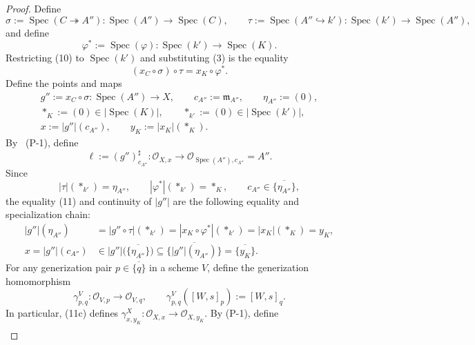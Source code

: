 \begin{proof}
  Define
  \[
    \sigma:=\operatorname{Spec}(C\twoheadrightarrow A'')
      \colon\operatorname{Spec}(A'')\to\operatorname{Spec}(C),
    \qquad
    \tau:=\operatorname{Spec}(A''\hookrightarrow k')
      \colon\operatorname{Spec}(k')\to\operatorname{Spec}(A''),
  \]
  and define
  \[
    \varphi^*:=\operatorname{Spec}(\varphi)
      \colon\operatorname{Spec}(k')\to\operatorname{Spec}(K).
  \]
  Restricting (10) to $\operatorname{Spec}(k')$ and substituting (3) is the
  equality
  \[
    (x_C\circ\sigma)\circ\tau=x_K\circ\varphi^*.                \tag{11}
  \]
  Define the points and maps
  \[
  \begin{gathered}
    g'':=x_C\circ\sigma\colon\operatorname{Spec}(A'')\to X,
    \qquad c_{A''}:=\mathfrak m_{A''},
    \qquad \eta_{A''}:=(0),\\
    \ast_K:=(0)\in|\operatorname{Spec}(K)|,
    \qquad \ast_{k'}:=(0)\in|\operatorname{Spec}(k')|,\\
    x:=|g''|(c_{A''}),
    \qquad y_K:=|x_K|(\ast_K).
  \end{gathered}                                                   \tag{11a}
  \]
  By ~(P-1), define
  \[
    \ell:=(g'')_{c_{A''}}^\sharp
      \colon\mathcal O_{X,x}\longrightarrow
      \mathcal O_{\operatorname{Spec}(A''),c_{A''}}=A''.
                                                                    \tag{11b}
  \]
  Since
  \[
    |\tau|(\ast_{k'})=\eta_{A''},
    \qquad |\varphi^*|(\ast_{k'})=\ast_K,
    \qquad c_{A''}\in\overline{\{\eta_{A''}\}},
  \]
  the equality (11) and continuity of $|g''|$ are the following equality and
  specialization chain:
  \[
  \begin{aligned}
    |g''|(\eta_{A''})
      &=|g''\circ\tau|(\ast_{k'})
       =|x_K\circ\varphi^*|(\ast_{k'})
       =|x_K|(\ast_K)=y_K,\\
    x=|g''|(c_{A''})
      &\in|g''|\bigl(\overline{\{\eta_{A''}\}}\bigr)
       \subseteq\overline{\{|g''|(\eta_{A''})\}}
       =\overline{\{y_K\}}.
  \end{aligned}                                                    \tag{11c}
  \]
  For any generization pair $p\in\overline{\{q\}}$ in a scheme $V$,
  define the generization homomorphism
  \[
    \gamma^V_{p,q}\colon\mathcal O_{V,p}\longrightarrow\mathcal O_{V,q},
    \qquad \gamma^V_{p,q}([W,s]_p):=[W,s]_q.                    \tag{11d}
  \]
  In particular, (11c) defines
  $\gamma^X_{x,y_K}\colon\mathcal O_{X,x}\to\mathcal O_{X,y_K}$.
  By (P-1), define
  \[
  \begin{gathered}

\end{gathered}\]
\end{proof}
